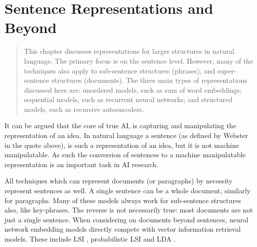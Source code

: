 \documentclass[12pt,parskip]{komatufte}
\begin{document}
\chapter{Sentence Representations and Beyond}\label{sec:sentence-representations-and-beyond}
\begin{abstract}
	This chapter discusses representations for larger structures in natural language.
	The primary focus is on the sentence level.
	However, many of the techniques also apply to sub-sentence structures (phrases), and super-sentence structures (documents).
	The three main types of representations discussed here are: unordered models, such as sum of word embeddings; sequential models, such as recurrent neural networks; and structured models, such as recursive autoencoders.
\end{abstract}




It can be argued that the core of true AI,
is  capturing and manipulating the representation of an idea.
In natural language a sentence (as defined by Webster in the quote above),
is such a representation of an idea, but it is not machine manipulatable.
As such the conversion of sentences to a machine manipulatable representation is an important task in AI research.


All techniques which can represent documents (or paragraphs) by necessity represent sentences as well.
A single sentence can be a whole document, similarly for paragraphs.
Many of these models always work for sub-sentence structures also, like key-phrases.
The reverse is not necessarily true: most documents are not just a single sentence.
When considering on documents beyond sentences,
neural network embedding models directly compete with vector information retrieval models.
These include LSI , probabilistic LSI  and  LDA .
\end{document}
